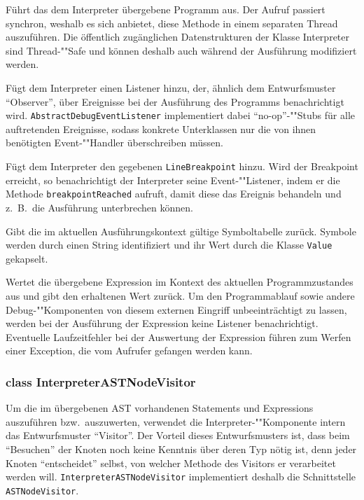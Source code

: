 \begin{description}

    Führt das dem Interpreter übergebene Programm aus. Der Aufruf passiert synchron, weshalb es sich anbietet, diese Methode in einem separaten Thread auszuführen. Die öffentlich zugänglichen Datenstrukturen der Klasse Interpreter sind Thread-""Safe und können deshalb auch während der Ausführung modifiziert werden.

    Fügt dem Interpreter einen Listener hinzu, der, ähnlich dem Entwurfsmuster ``Observer'', über Ereignisse bei der Ausführung des Programms benachrichtigt wird. \texttt{AbstractDebugEventListener} implementiert dabei ``no-op''-""Stubs für alle auftretenden Ereignisse, sodass konkrete Unterklassen nur die von ihnen benötigten Event-""Handler überschreiben müssen.

    Fügt dem Interpreter den gegebenen \texttt{LineBreakpoint} hinzu. Wird der Breakpoint erreicht, so benachrichtigt der Interpreter seine Event-""Listener, indem er die Methode \texttt{breakpointReached} aufruft, damit diese das Ereignis behandeln und z.~B.\ die Ausführung unterbrechen können.

     Gibt die im aktuellen Ausführungskontext gültige Symboltabelle zurück. Symbole werden durch einen String identifiziert und ihr Wert durch die Klasse \texttt{Value} gekapselt.

    Wertet die übergebene Expression im Kontext des aktuellen Programmzustandes aus und gibt den erhaltenen Wert zurück. Um den Programmablauf sowie andere Debug-""Komponenten von diesem externen Eingriff unbeeinträchtigt zu lassen, werden bei der Ausführung der Expression keine Listener benachrichtigt. Eventuelle Laufzeitfehler bei der Auswertung der Expression führen zum Werfen einer Exception, die vom Aufrufer gefangen werden kann.
\end{description}

\subsubsection{class InterpreterASTNodeVisitor}
Um die im übergebenen AST vorhandenen Statements und Expressions auszuführen bzw.\ auszuwerten, verwendet die Interpreter-""Komponente intern das Entwurfsmuster ``Visitor''. Der Vorteil dieses Entwurfsmusters ist, dass beim ``Besuchen'' der Knoten noch keine Kenntnis über deren Typ nötig ist, denn jeder Knoten ``entscheidet'' selbst, von welcher Methode des Visitors er verarbeitet werden will. \texttt{InterpreterASTNodeVisitor} implementiert deshalb die Schnittstelle \texttt{ASTNodeVisitor}.

